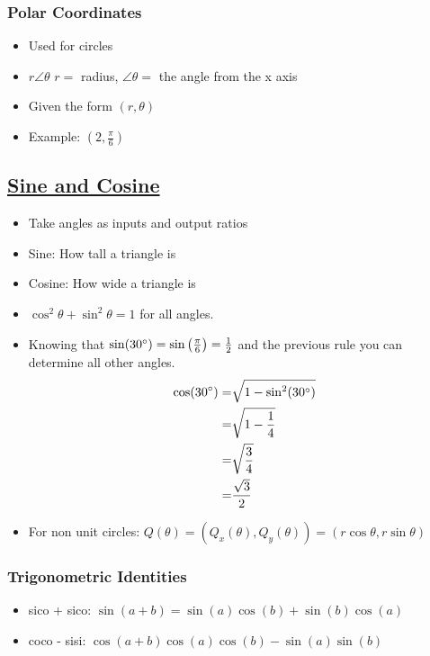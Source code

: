 \documentclass{article}
\begin{document}
\subsubsection{Polar Coordinates}
\begin{itemize}
  \item Used for circles
  \item $r\angle\theta$ $r =$ radius, $\angle\theta =$ the angle from the x axis
  \item Given the form $(r, \theta)$
  \item Example: $\left(2, \frac{\pi}{6}\right)$
\end{itemize}
\subsection{\underline{Sine and Cosine}}
\begin{itemize}
  \item Take angles as inputs and output ratios
  \item Sine: How tall a triangle is
  \item Cosine: How wide a triangle is
  \item $\cos^{2}\theta + \sin^{2}\theta = 1$ for all angles.
  \item Knowing that $\sin(30\degree) = \sin\left(\frac{\pi}{6}\right) = \frac{1}{2}$ and the previous rule you can determine all other angles.
  \begin{align*}
    \cos(30\degree) =& \sqrt{1 - \sin^{2}(30\degree)}\\
                    =& \sqrt{1 - \frac{1}{4}}\\
                    =& \sqrt{\frac{3}{4}}\\
                    =& \frac{\sqrt{3}}{2}
  \end{align*}
  \item For non unit circles: $Q(\theta) = (Q_{x}(\theta), Q_{y}(\theta)) = (r \cos\theta, r \sin\theta)$
\end{itemize}

\subsubsection{Trigonometric Identities}
\begin{itemize}
  \item sico + sico: $\sin(a + b) = \sin(a)\cos(b) + \sin(b)\cos(a)$
  \item coco - sisi: $\cos(a + b)  \cos(a)\cos(b) - \sin(a)\sin(b)$
\end{itemize}
\end{document}

